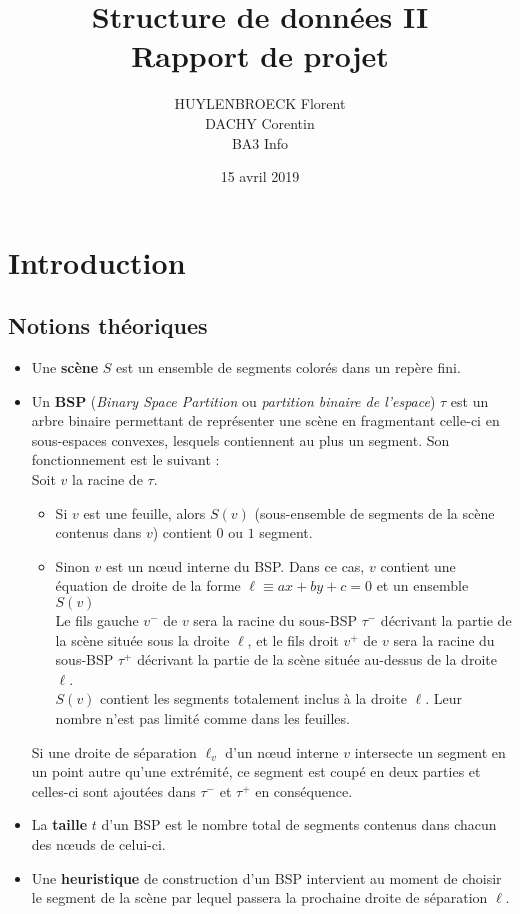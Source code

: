 \documentclass[11pts]{article}
\title{Structure de données II\\Rapport de projet}
\author{HUYLENBROECK Florent\\DACHY Corentin\\BA3 Info}
\date{15 avril 2019}
\begin{document}
\maketitle
\newpage
\tableofcontents
\newpage
\section{Introduction}
\subsection{Notions théoriques}
\begin{itemize}
\item Une \textbf{scène} $S$ est un ensemble de segments colorés dans un repère fini.
\item Un \textbf{BSP} (\emph{Binary Space Partition} ou \emph{partition binaire de l'espace}) $\tau$ est un arbre binaire permettant de représenter une scène en fragmentant celle-ci en sous-espaces convexes, lesquels contiennent au plus un segment.
Son fonctionnement est le suivant :\\[.2cm]
Soit $v$ la racine de $\tau$.
\begin{itemize}
\item Si $v$ est une feuille, alors $S(v)$ (sous-ensemble de segments de la scène contenus dans $v$) contient $0$ ou $1$ segment.
\item Sinon $v$ est un nœud interne du BSP. Dans ce cas, $v$ contient une équation de droite de la forme $\ell\equiv ax+by+c=0$ et un ensemble $S(v)$\\
Le fils gauche $v^-$ de $v$ sera la racine du sous-BSP $\tau^-$ décrivant la partie de la scène située sous la droite $\ell$, et le fils droit $v^+$ de $v$ sera la racine du sous-BSP $\tau^+$ décrivant la partie de la scène située au-dessus de la droite $\ell$.\\
$S(v)$ contient les segments totalement inclus à la droite $\ell$. Leur nombre n'est pas limité comme dans les feuilles.
\end{itemize}
Si une droite de séparation $\ell_v$ d'un nœud interne $v$ intersecte un segment en un point autre qu'une extrémité, ce segment est coupé en deux parties et celles-ci sont ajoutées dans $\tau^-$ et $\tau^+$ en conséquence.
\item La \textbf{taille} $t$ d'un BSP est le nombre total de segments contenus dans chacun des nœuds de celui-ci.
\item Une \textbf{heuristique} de construction d'un BSP intervient au moment de choisir le segment de la scène par lequel passera la prochaine droite de séparation $\ell$.
\end{itemize}
\end{document}
